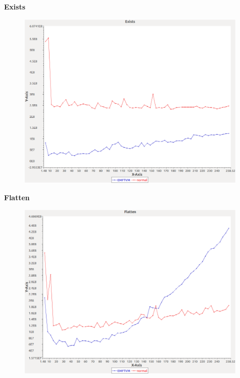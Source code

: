 \noindent\textbf{Exists}

\begin{figure}[h]
\centering
\includegraphics[width=\textwidth]{../graphs/bag/Exists}
\end{figure}
\pagebreak

\noindent\textbf{Flatten}

\begin{figure}[h]
\centering
\includegraphics[width=\textwidth]{../graphs/bag/Flatten}
\end{figure}
\pagebreak


